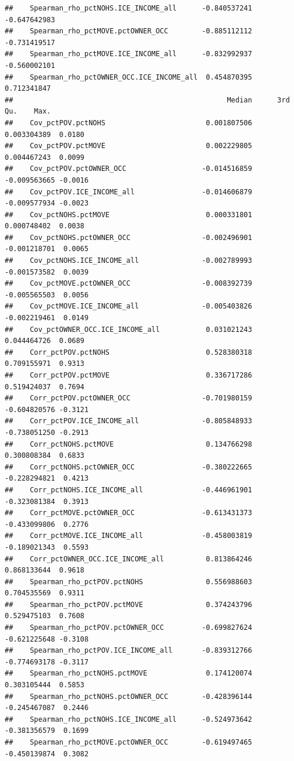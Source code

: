\documentclass[
]{book}
\begin{document}
\begin{verbatim}
##    Spearman_rho_pctNOHS.ICE_INCOME_all      -0.840537241 -0.647642983
##    Spearman_rho_pctMOVE.pctOWNER_OCC        -0.885112112 -0.731419517
##    Spearman_rho_pctMOVE.ICE_INCOME_all      -0.832992937 -0.560002101
##    Spearman_rho_pctOWNER_OCC.ICE_INCOME_all  0.454870395  0.712341847
##                                                   Median      3rd Qu.    Max.
##    Cov_pctPOV.pctNOHS                        0.001807506  0.003304389  0.0180
##    Cov_pctPOV.pctMOVE                        0.002229805  0.004467243  0.0099
##    Cov_pctPOV.pctOWNER_OCC                  -0.014516859 -0.009563665 -0.0016
##    Cov_pctPOV.ICE_INCOME_all                -0.014606879 -0.009577934 -0.0023
##    Cov_pctNOHS.pctMOVE                       0.000331801  0.000748402  0.0038
##    Cov_pctNOHS.pctOWNER_OCC                 -0.002496901 -0.001218701  0.0065
##    Cov_pctNOHS.ICE_INCOME_all               -0.002789993 -0.001573582  0.0039
##    Cov_pctMOVE.pctOWNER_OCC                 -0.008392739 -0.005565503  0.0056
##    Cov_pctMOVE.ICE_INCOME_all               -0.005403826 -0.002219461  0.0149
##    Cov_pctOWNER_OCC.ICE_INCOME_all           0.031021243  0.044464726  0.0689
##    Corr_pctPOV.pctNOHS                       0.528380318  0.709155971  0.9313
##    Corr_pctPOV.pctMOVE                       0.336717286  0.519424037  0.7694
##    Corr_pctPOV.pctOWNER_OCC                 -0.701980159 -0.604820576 -0.3121
##    Corr_pctPOV.ICE_INCOME_all               -0.805848933 -0.738051250 -0.2913
##    Corr_pctNOHS.pctMOVE                      0.134766298  0.300808384  0.6833
##    Corr_pctNOHS.pctOWNER_OCC                -0.380222665 -0.228294821  0.4213
##    Corr_pctNOHS.ICE_INCOME_all              -0.446961901 -0.323081384  0.3913
##    Corr_pctMOVE.pctOWNER_OCC                -0.613431373 -0.433099806  0.2776
##    Corr_pctMOVE.ICE_INCOME_all              -0.458003819 -0.189021343  0.5593
##    Corr_pctOWNER_OCC.ICE_INCOME_all          0.813864246  0.868133644  0.9618
##    Spearman_rho_pctPOV.pctNOHS               0.556988603  0.704535569  0.9311
##    Spearman_rho_pctPOV.pctMOVE               0.374243796  0.529475103  0.7608
##    Spearman_rho_pctPOV.pctOWNER_OCC         -0.699827624 -0.621225648 -0.3108
##    Spearman_rho_pctPOV.ICE_INCOME_all       -0.839312766 -0.774693178 -0.3117
##    Spearman_rho_pctNOHS.pctMOVE              0.174120074  0.303105444  0.5853
##    Spearman_rho_pctNOHS.pctOWNER_OCC        -0.428396144 -0.245467087  0.2446
##    Spearman_rho_pctNOHS.ICE_INCOME_all      -0.524973642 -0.381356579  0.1699
##    Spearman_rho_pctMOVE.pctOWNER_OCC        -0.619497465 -0.450139874  0.3082

\end{verbatim}
\end{document}
